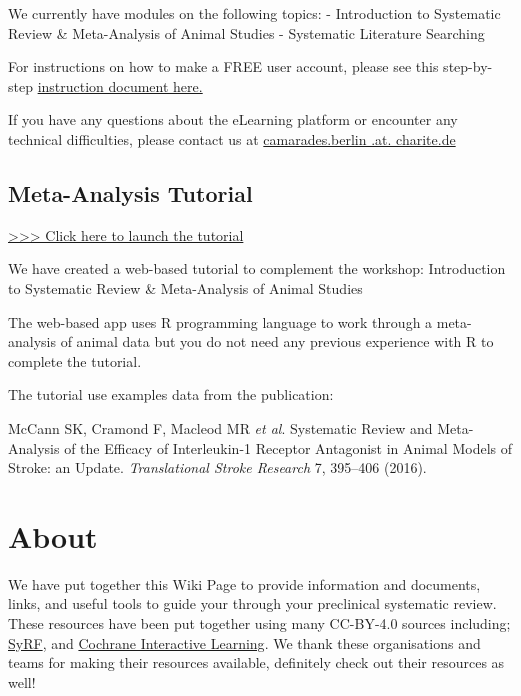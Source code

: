 \documentclass[
]{book}
\begin{document}
We currently have modules on the following topics:
- Introduction to Systematic Review \& Meta-Analysis of Animal Studies
- Systematic Literature Searching

For instructions on how to make a FREE user account, please see this step-by-step \href{eLearning_course_account_guide.pdf}{instruction document here.}

If you have any questions about the eLearning platform or encounter any technical difficulties, please contact us at \href{mailto:CAMARADES.berlin@charite.de}{camarades.berlin .at. charite.de}

\hypertarget{meta-analysis-tutorial}{%
\section{Meta-Analysis Tutorial}\label{meta-analysis-tutorial}}

\href{https://s-quest.bihealth.org/CAMARADES_MA/}{\textgreater\textgreater\textgreater{} Click here to launch the tutorial}

We have created a web-based tutorial to complement the workshop:
Introduction to Systematic Review \& Meta-Analysis of Animal Studies

The web-based app uses R programming language to work through a meta-analysis of animal data but you do not need any previous experience with R to complete the tutorial.

The tutorial use examples data from the publication:

McCann SK, Cramond F, Macleod MR \emph{et al}. Systematic Review and
Meta-Analysis of the Efficacy of Interleukin-1 Receptor Antagonist in
Animal Models of Stroke: an Update. \emph{Translational Stroke Research} 7, 395--406 (2016).

\hypertarget{about}{%
\chapter{About}\label{about}}

We have put together this Wiki Page to provide information and documents, links, and useful tools to guide your through your preclinical systematic review. These resources have been put together using many CC-BY-4.0 sources including; \href{https://syrf.org.uk/}{SyRF}, and \href{https://training.cochrane.org/interactivelearning}{Cochrane Interactive Learning}. We thank these organisations and teams for making their resources available, definitely check out their resources as well!
\end{document}

